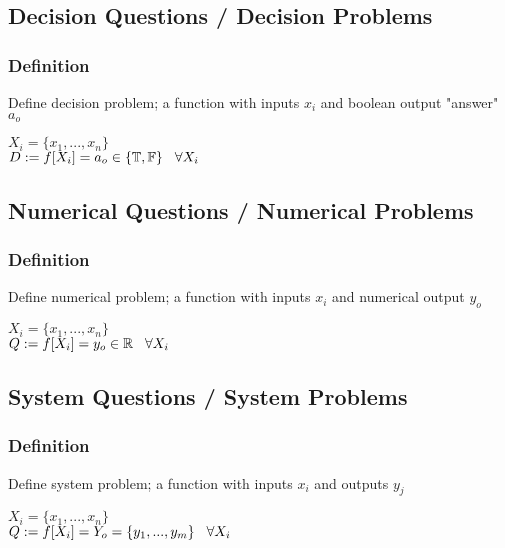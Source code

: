 \documentclass[11pt]{article}
\begin{document}
\subsection{Decision Questions / Decision Problems}
\subsubsection{Definition}
Define decision problem; a function with inputs $x_i$ and boolean output "answer" $a_o$
\begin{center}
$
X_i = \{x_1,...,x_n\}
$
\\ \vspace{2mm}
$
D := f \lbrack X_i \rbrack = a_{o} \in \{\mathbb{T}, \mathbb{F}\} \hspace{3mm} \forall X_i
$
\end{center}



\subsection{Numerical Questions / Numerical Problems}

\subsubsection{Definition}
Define numerical problem; a function with inputs $x_i$ and numerical output $y_o$
\begin{center}
$
X_i = \{x_1,...,x_n\}
$
\\ \vspace{2mm}
$
Q := f \lbrack X_i \rbrack = y_{o} \in \mathbb{R} \hspace{3mm} \forall X_i
$
\end{center}



\subsection{System Questions / System Problems}
\subsubsection{Definition}
Define system problem; a function with inputs $x_i$ and outputs $y_j$
\begin{center}
$
X_i = \{x_1,...,x_n\}
$
\\ \vspace{2mm}
$
Q := f \lbrack X_i \rbrack = Y_{o} = \{y_1,...,y_m\} \hspace{3mm} \forall X_i
$
\end{center}
\end{document}
